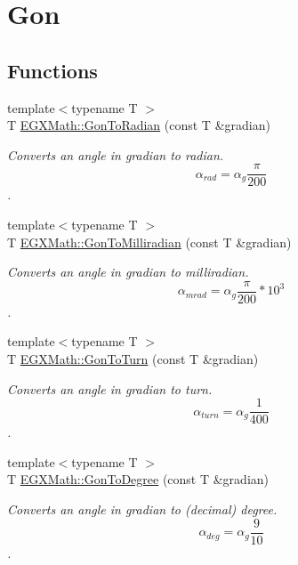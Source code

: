 \hypertarget{group___e_g_x_math-_angle_conversions-_gon}{}\section{Gon}
\label{group___e_g_x_math-_angle_conversions-_gon}
\subsection*{Functions}
\begin{DoxyCompactItemize}
\item 
{\footnotesize template$<$typename T $>$ }\\T \mbox{\hyperlink{group___e_g_x_math-_angle_conversions-_gon_gafdf7d525a98427da55b86ff420a5ec86}{E\+G\+X\+Math\+::\+Gon\+To\+Radian}} (const T \&gradian)
\begin{DoxyCompactList}\small\item\em Converts an angle in gradian to radian. \[\alpha_{rad}=\alpha_{g}\frac{\pi}{200}\]. \end{DoxyCompactList}\item 
{\footnotesize template$<$typename T $>$ }\\T \mbox{\hyperlink{group___e_g_x_math-_angle_conversions-_gon_gae5956f7e80b143f3cc22eb8122c1b745}{E\+G\+X\+Math\+::\+Gon\+To\+Milliradian}} (const T \&gradian)
\begin{DoxyCompactList}\small\item\em Converts an angle in gradian to milliradian. \[\alpha_{mrad}=\alpha_{g}\frac{\pi}{200}*10^3\]. \end{DoxyCompactList}\item 
{\footnotesize template$<$typename T $>$ }\\T \mbox{\hyperlink{group___e_g_x_math-_angle_conversions-_gon_gae55acf3fc27d34374b5ec10e0a471b3b}{E\+G\+X\+Math\+::\+Gon\+To\+Turn}} (const T \&gradian)
\begin{DoxyCompactList}\small\item\em Converts an angle in gradian to turn. \[\alpha_{turn}=\alpha_{g}\frac{1}{400}\]. \end{DoxyCompactList}\item 
{\footnotesize template$<$typename T $>$ }\\T \mbox{\hyperlink{group___e_g_x_math-_angle_conversions-_gon_gaf1c40076eaf3be4e070ff34045db55d1}{E\+G\+X\+Math\+::\+Gon\+To\+Degree}} (const T \&gradian)
\begin{DoxyCompactList}\small\item\em Converts an angle in gradian to (decimal) degree. \[\alpha_{deg}=\alpha_{g}\frac{9}{10}\]. \end{DoxyCompactList}\item 

\end{DoxyCompactItemize}
